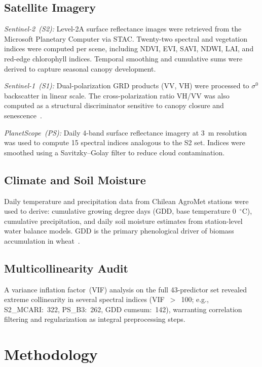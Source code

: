 \documentclass[lettersize,journal]{IEEEtran}
\begin{document}
\subsection{Satellite Imagery}

\textit{Sentinel-2~(S2):} Level-2A surface reflectance images were retrieved
from the Microsoft Planetary Computer via STAC. Twenty-two spectral and
vegetation indices were computed per scene, including NDVI, EVI, SAVI, NDWI,
LAI, and red-edge chlorophyll indices. Temporal smoothing and cumulative sums
were derived to capture seasonal canopy development.

\textit{Sentinel-1~(S1):} Dual-polarization GRD products (VV, VH) were
processed to $\sigma^0$ backscatter in linear scale. The cross-polarization
ratio VH/VV was also computed as a structural discriminator sensitive to
canopy closure and senescence~\cite{ref13}.

\textit{PlanetScope~(PS):} Daily 4-band surface reflectance imagery at 3~m
resolution was used to compute 15 spectral indices analogous to the S2 set.
Indices were smoothed using a Savitzky--Golay filter to reduce cloud
contamination.

\subsection{Climate and Soil Moisture}

Daily temperature and precipitation data from Chilean AgroMet stations were
used to derive: cumulative growing degree days (GDD, base temperature 0~$^{\circ}$C),
cumulative precipitation, and daily soil moisture estimates from station-level
water balance models. GDD is the primary phenological driver of biomass
accumulation in wheat~\cite{ref14}.

\subsection{Multicollinearity Audit}

A variance inflation factor~(VIF) analysis on the full 43-predictor set
revealed extreme collinearity in several spectral indices (VIF~$>$~100;
e.g., S2\_MCARI:~322, PS\_B3:~262, GDD cumsum:~142), warranting
correlation filtering and regularization as integral preprocessing steps.

\section{Methodology}
\end{document}

